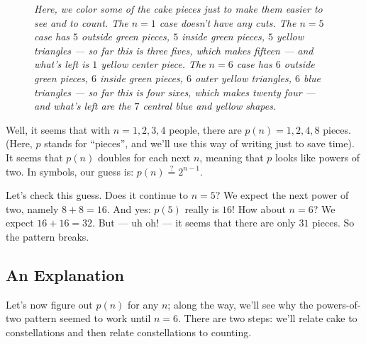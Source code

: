 \documentclass{article}
\begin{document}
\begin{figure}[h!]
                \caption{\emph{
                    Here, we color some of the cake pieces just to make them
                    easier to see and to count.
                    The $n=1$ case doesn't have any cuts.
                    The $n=5$ case has $5$ outside green pieces, $5$ inside
                    green pieces, $5$ yellow triangles --- so far this is three
                    fives, which makes fifteen --- and what's left is $1$
                    yellow center piece.
                    The $n=6$ case has $6$ outside green pieces, $6$ inside
                    green pieces, $6$ outer yellow triangles, $6$ blue
                    triangles --- so far this is four sixes, which makes twenty
                    four --- and what's left are the $7$ central blue and
                    yellow shapes.
                }}
            \end{figure}

            Well, it seems that with $n=1, 2, 3, 4$ people, there are $p(n) =
            1, 2, 4, 8$ pieces.  (Here, $p$ stands for ``pieces'', and we'll
            use this way of writing just to save time).  It seems that $p(n)$
            doubles for each next $n$, meaning that $p$ looks like powers of
            two.  In symbols, our guess is: $p(n) \stackrel{?}{=} 2^{n-1}$.

            Let's check this guess.  Does it continue to $n=5$?  We expect the
            next power of two, namely $8+8=16$.  And yes: $p(5)$ really is
            $16$!  How about $n=6$?  We expect $16+16=32$.  But --- uh oh! ---
            it seems that there are only $31$ pieces.  So the pattern breaks.

        \subsection{An Explanation}
            Let's now figure out $p(n)$ for any $n$; along the way, we'll see
            why the powers-of-two pattern seemed to work until $n=6$.
            There are two steps: we'll relate cake to constellations
            and then relate constellations to counting.
\end{document}
